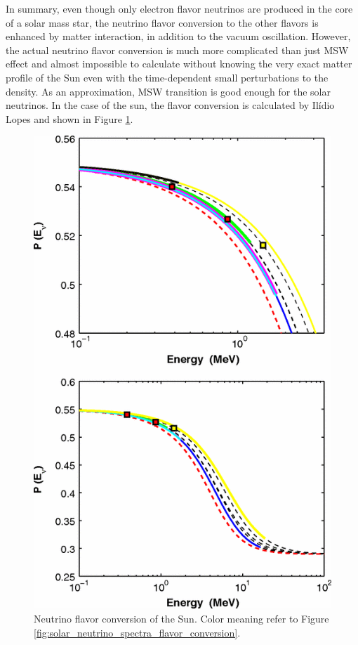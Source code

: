 In summary, even though only electron flavor neutrinos are produced in the core of a solar mass star, the neutrino flavor conversion to the other flavors is enhanced by matter interaction, in addition to the vacuum oscillation. However, the actual neutrino flavor conversion is much more complicated than just MSW effect and almost impossible to calculate without knowing the very exact matter profile of the Sun even with the time-dependent small perturbations to the density. As an approximation, MSW transition is good enough for the solar neutrinos.\cite{Lopes2013a} In the case of the sun, the flavor conversion is calculated by Ilídio Lopes and shown in Figure \ref{fig:solar_neutrino_flavor_conversion}.\cite{Lopes2013}

\begin{figure}
\centering
\includegraphics[width=\columnwidth]{chapters/assets/solar/solar_neutrino_flavor_conversion.png}
\caption{Neutrino flavor conversion of the Sun. Color meaning refer to Figure \ref{fig:solar_neutrino_spectra_flavor_conversion}.\cite{Lopes2013} }
\label{fig:solar_neutrino_flavor_conversion}
\end{figure}



